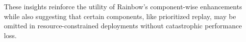 \documentclass{article}
\begin{document}
These insights reinforce the utility of Rainbow’s component-wise enhancements while also suggesting that certain components, like prioritized replay, may be omitted in resource-constrained deployments without catastrophic performance loss.






\end{document}
